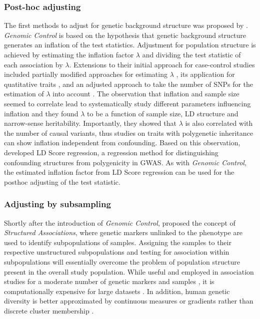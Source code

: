 \subsubsection{Post-hoc adjusting}
The first methods to adjust for genetic background structure was proposed by \citet{Devlin1999}. \textit{Genomic Control} is based on the hypothesis that genetic background structure generates an inflation of the test statistics. Adjustment for population structure is achieved by estimating the inflation factor \(\lambda\) and dividing the test statistic of each association by \(\lambda\). Extensions to their initial approach for case-control studies included partially modified approaches for estimating \(\lambda\) \citep{Reich2001}, its application for quatitative traits \citep{Bacanu2002}, and an adjusted approach to take the number of SNPs for the estimation of \(\lambda\) into account \citep{Devlin2004}. The observation that inflation and sample size seemed to correlate lead \citet{Yang2011} to systematically study different parameters influencing inflation and they found \(\lambda\) to be a function of sample size, LD structure and narrow-sense heritability. Importantly, they showed that \(\lambda\) is also correlated with the number of causal variants, thus studies on traits with polygenetic inheritance can show inflation independent from confounding. Based on this observation, \citet{Bulik-Sullivan2015} developed LD Score regression, a regression method for distinguishing confounding structures from polygenicity in GWAS. As with \textit{Genomic Control}, the estimated inflation factor from LD Score regression can be used for the posthoc adjusting of the test statistic. 
\subsubsection{Adjusting by subsampling}
Shortly after the introduction of \textit{Genomic Control}, \citet{Pritchard2000} proposed the concept of \textit{Structured Associations}, where genetic markers unlinked to the phenotype are used to identify subpopulations of samples. Assigning the samples to their respective unstructured subpopulations and testing for association within subpopulations will essentially overcome the problem of population structure present in the overall study population. While useful and employed in association studies for a moderate number of genetic markers and samples \citep{Li2004,Stein2009,Kulbrock2013}, it is computationally expensive for large datasets \citep{Price2006}. In addition, human genetic diversity is better approximated by continuous measures or gradients rather than discrete cluster membership \citep{Serre2004,Price2006}.

